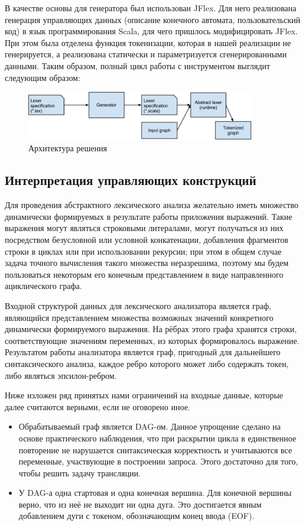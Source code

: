 В качестве основы для генератора был использован JFlex. Для него реализована генерация управляющих 
данных (описание конечного автомата, пользовательский код) в язык 
программирования Scala, для чего пришлось модифицировать JFlex. При этом была 
отделена функция токенизации, которая в нашей реализации не генерируется, а 
реализована статически и параметризуется сгенерированными данными. Таким образом, 
полный цикл работы с инструментом выглядит следующим образом:

\begin{figure}[h]
 \label{Arch}
 \centering
 \includegraphics[width=10cm]{Verbitskaya/AL_base_arch.png}
 \caption{Архитектура решения}
 \label{Arch}
\end{figure}

\subsection{Интерпретация управляющих конструкций}
Для проведения абстрактного лексического анализа желательно иметь множество 
динамически формируемых в результате работы приложения выражений. Такие выражения 
могут являться строковыми литералами, могут получаться из них посредством 
безусловной или условной конкатенации, добавления фрагментов строки в циклах 
или при использовании рекурсии; при этом в общем случае задача точного вычисления такого множества 
неразрешима, поэтому мы будем пользоваться некоторым его конечным представлением 
в виде направленного ациклического графа.

Входной структурой данных для лексического анализатора является граф, являющийся 
представлением множества возможных значений конкретного динамически формируемого 
выражения. На рёбрах этого графа хранятся строки, соответствующие значениям 
переменных, из которых формировалось выражение. Результатом работы анализатора 
является граф, пригодный для дальнейшего синтаксического анализа, каждое ребро 
которого может либо содержать токен, либо являться эпсилон-ребром.

Ниже изложен ряд принятых нами ограничений на входные данные, которые далее 
считаются верными, если не оговорено иное.
\begin{itemize}
    \item Обрабатываемый граф является DAG-ом. Данное упрощение сделано на 
    основе практического наблюдения, что при раскрытии цикла в единственное 
    повторение не нарушается синтаксическая корректность и учитываются все 
    переменные, участвующие в построении запроса. Этого достаточно для того, 
    чтобы решить задачу трансляции. 
    \item У DAG-а одна стартовая и одна конечная вершина. Для конечной вершины 
    верно, что из неё не выходит ни одна дуга. Это достигается явным добавлением 
    дуги с токеном, обозначающим конец ввода (EOF).
\end{itemize}

